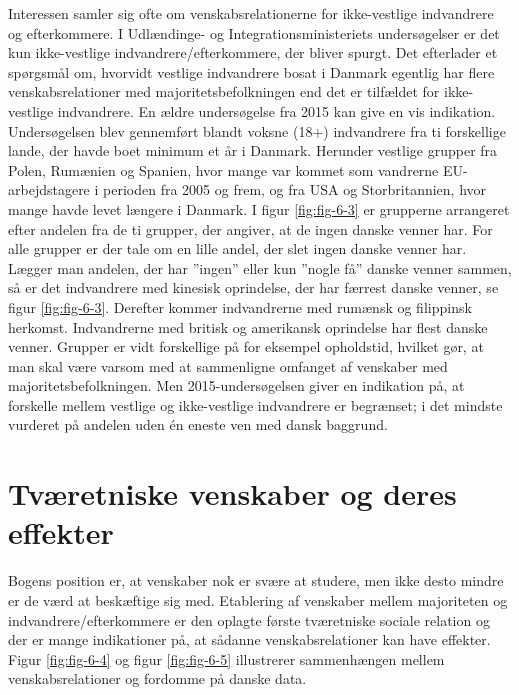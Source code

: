 \documentclass[
]{book}
\begin{document}
Interessen samler sig ofte om venskabsrelationerne for ikke-vestlige indvandrere og efterkommere. I Udlændinge- og Integrationsministeriets undersøgelser er det kun ikke-vestlige indvandrere/efterkommere, der bliver spurgt. Det efterlader et spørgsmål om, hvorvidt vestlige indvandrere bosat i Danmark egentlig har flere venskabsrelationer med majoritetsbefolkningen end det er tilfældet for ikke-vestlige indvandrere. En ældre undersøgelse fra 2015 kan give en vis indikation. Undersøgelsen blev gennemført blandt voksne (18+) indvandrere fra ti forskellige lande, der havde boet minimum et år i Danmark. Herunder vestlige grupper fra Polen, Rumænien og Spanien, hvor mange var kommet som vandrerne EU-arbejdstagere i perioden fra 2005 og frem, og fra USA og Storbritannien, hvor mange havde levet længere i Danmark. I figur \ref{fig:fig-6-3} er grupperne arrangeret efter andelen fra de ti grupper, der angiver, at de ingen danske venner har. For alle grupper er der tale om en lille andel, der slet ingen danske venner har. Lægger man andelen, der har ''ingen'' eller kun ''nogle få'' danske venner sammen, så er det indvandrere med kinesisk oprindelse, der har færrest danske venner, se figur \ref{fig:fig-6-3}. Derefter kommer indvandrerne med rumænsk og filippinsk herkomst. Indvandrerne med britisk og amerikansk oprindelse har flest danske venner. Grupper er vidt forskellige på for eksempel opholdstid, hvilket gør, at man skal være varsom med at sammenligne omfanget af venskaber med majoritetsbefolkningen. Men 2015-undersøgelsen giver en indikation på, at forskelle mellem vestlige og ikke-vestlige indvandrere er begrænset; i det mindste vurderet på andelen uden én eneste ven med dansk baggrund.

\section{Tværetniske venskaber og deres effekter}\label{tvuxe6retniske-venskaber-og-deres-effekter}

Bogens position er, at venskaber nok er svære at studere, men ikke desto mindre er de værd at beskæftige sig med. Etablering af venskaber mellem majoriteten og indvandrere/efterkommere er den oplagte første tværetniske sociale relation og der er mange indikationer på, at sådanne venskabsrelationer kan have effekter. Figur \ref{fig:fig-6-4} og figur \ref{fig:fig-6-5} illustrerer sammenhængen mellem venskabsrelationer og fordomme på danske data.
\end{document}
